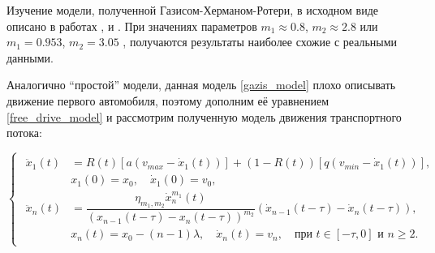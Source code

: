 \documentclass[12pt, a4paper]{extarticle}
\numberwithin{equation}{section}
\numberwithin{figure}{section}
\begin{document}
Изучение модели, полученной Газисом-Херманом-Ротери, в исходном виде описано в работах \cite{StudyingGazisModel_1},  \cite{StudyingGazisModel_2} и  \cite{StudyingGazisModel_3}. При значениях параметров $m_1 \approx 0.8$, $m_2 \approx 2.8$ \cite{StudyingGazisModel_1} или $m_1 = 0.953$, $m_2 = 3.05$ \cite{StudyingGazisModel_2}, \cite{StudyingGazisModel_3} получаются результаты наиболее схожие с реальными данными.

Аналогично ``простой'' модели, данная модель \eqref{gazis_model} плохо описывать движение первого автомобиля, поэтому дополним её уравнением \eqref{free_drive_model} и рассмотрим полученную модель движения транспортного потока:

\begin{equation} \label{full_gazis_model}
\begin{cases}
\begin{split}
\ddot{x}_1(t)& = R(t) \left[ a\left(v_{max}-\dot{x}_1(t) \right)\right] + (1-R(t)) \left[ q\left( v_{min} - \dot{x}_1(t)\right) \right], \\
&x_{1}(0)=x_0, \quad \dot{x}_{1}(0)=v_{0},\\
\ddot{x}_n(t)& = \dfrac{\eta_{m_1,m_2}\dot{x}_n^{m_1}(t)}{(x_{n-1}(t-\tau)-x_n(t-\tau))^{m_2}} (\dot{x}_{n-1}(t-\tau) - \dot{x}_{n}(t-\tau)), \\
&x_n(t)=x_0-(n-1)\lambda, \quad \dot{x}_n(t)=v_{n}, \quad \text{при } t \in [-\tau,0] \text{ и } n\geq2.
\end{split}
\end{cases}
\end{equation}
\end{document}
